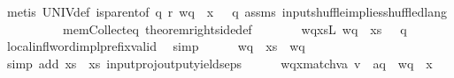 \begin{isabellebody}
\ {\isacharparenleft}{\kern0pt}metis\ UNIV{\isacharunderscore}{\kern0pt}def\ {\isacartoucheopen}is{\isacharunderscore}{\kern0pt}parent{\isacharunderscore}{\kern0pt}of\ q\ r{\isacartoucheclose}\ {\isacartoucheopen}wq\ {\isasymsqdot}\ x\ {\isasymin}\ {\isasymL}\isactrlsup {\isacharasterisk}{\kern0pt}\ q{\isacartoucheclose}\ assms{\isacharparenleft}{\kern0pt}{}{\isacharparenright}{\kern0pt}\ input{\isacharunderscore}{\kern0pt}shuffle{\isacharunderscore}{\kern0pt}implies{\isacharunderscore}{\kern0pt}shuffled{\isacharunderscore}{\kern0pt}lang\isanewline
\ \ \ \ \ \ \ \ \ \ mem{\isacharunderscore}{\kern0pt}Collect{\isacharunderscore}{\kern0pt}eq\ theorem{\isacharunderscore}{\kern0pt}rightside{\isacharunderscore}{\kern0pt}def{\isacharparenright}{\kern0pt}\isanewline
\ \ \ \ \isamarkupfalse%
\ \isamarkupfalse%
\ wqxs{\isacharunderscore}{\kern0pt}L{\isacharcolon}{\kern0pt}\ {\isachardoublequoteopen}wq\ {\isasymsqdot}\ xs\ {\isasymin}\ {\isasymL}\isactrlsup {\isacharasterisk}{\kern0pt}\ q{\isachardoublequoteclose}\ \isamarkupfalse%
\ local{\isachardot}{\kern0pt}infl{\isacharunderscore}{\kern0pt}word{\isacharunderscore}{\kern0pt}impl{\isacharunderscore}{\kern0pt}prefix{\isacharunderscore}{\kern0pt}valid\ \isamarkupfalse%
\ simp\isanewline
\ \ \ \ \isamarkupfalse%
\ {\isachardoublequoteopen}{\isacharparenleft}{\kern0pt}wq\ {\isasymsqdot}\ xs{\isacharparenright}{\kern0pt}{\isasymdown}\isactrlsub {\isacharbang}{\kern0pt}\ {\isacharequal}{\kern0pt}\ wq{\isasymdown}\isactrlsub {\isacharbang}{\kern0pt}{\isachardoublequoteclose}\ \isamarkupfalse%
\ {\isacharparenleft}{\kern0pt}simp\ add{\isacharcolon}{\kern0pt}\ {\isacartoucheopen}xs{\isasymdown}\isactrlsub {\isacharquery}{\kern0pt}\ {\isacharequal}{\kern0pt}\ xs{\isacartoucheclose}\ input{\isacharunderscore}{\kern0pt}proj{\isacharunderscore}{\kern0pt}output{\isacharunderscore}{\kern0pt}yields{\isacharunderscore}{\kern0pt}eps{\isacharparenright}{\kern0pt}\isanewline
\ \ \ \ \isamarkupfalse%
\ wqx{\isacharunderscore}{\kern0pt}match{\isacharunderscore}{\kern0pt}v{\isacharprime}{\kern0pt}a{\isacharcolon}{\kern0pt}\ {\isachardoublequoteopen}{\isacharparenleft}{\kern0pt}{\isacharparenleft}{\kern0pt}{\isacharparenleft}{\kern0pt}{\isacharparenleft}{\kern0pt}{\isacharquery}{\kern0pt}v{\isacharprime}{\kern0pt}\ {\isasymsqdot}\ {\isacharbrackleft}{\kern0pt}a{\isacharbrackright}{\kern0pt}{\isacharparenright}{\kern0pt}{\isasymdown}\isactrlsub q{\isacharparenright}{\kern0pt}{\isasymdown}\isactrlsub {\isacharquery}{\kern0pt}{\isacharparenright}{\kern0pt}{\isasymdown}\isactrlsub {\isacharbang}{\kern0pt}\isactrlsub {\isacharquery}{\kern0pt}{\isacharparenright}{\kern0pt}\ {\isacharequal}{\kern0pt}\ {\isacharparenleft}{\kern0pt}{\isacharparenleft}{\kern0pt}{\isacharparenleft}{\kern0pt}wq\ {\isasymsqdot}\ x{\isacharparenright}{\kern0pt}{\isasymdown}\isactrlsub {\isacharquery}{\kern0pt}{\isacharparenright}{\kern0pt}{\isasymdown}\isactrlsub {\isacharbang}{\kern0pt}\isactrlsub {\isacharquery}{\kern0pt}{\isacharparenright}{\kern0pt}{\isachardoublequoteclose}\ \ \isamarkupfalse%

\end{isabellebody}
